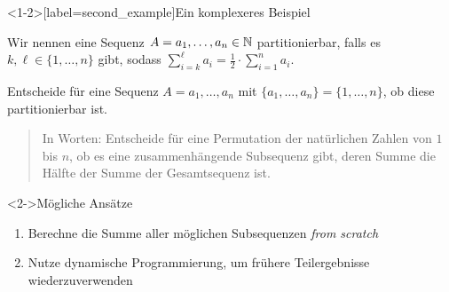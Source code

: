 \begin{frame}<1-2>[label=second_example]{Ein komplexeres Beispiel}
\begin{example}
Wir nennen eine Sequenz $A = a_1, \dots, a_n \in \mathbb{N}$ \alert{partitionierbar}, falls  es $k, \ell \in \{1, \dots, n\}$ gibt, sodass $\sum_{i=k}^{\ell} a_i = \frac{1}{2} \cdot  \sum_{i=1}^{n} a_i$.

Entscheide f\"ur eine Sequenz $A = a_1, \dots, a_n$ mit $\{ a_1, \dots, a_n \} = \{1, \dots, n\}$, ob diese partitionierbar ist.

\begin{quote}
    In Worten: Entscheide f\"ur eine \alert{Permutation} der nat\"urlichen Zahlen von $1$ bis $n$, ob es eine \alert{zusammenh\"angende Subsequenz} gibt, deren Summe die \alert{H\"alfte} der Summe der Gesamtsequenz ist.
\end{quote}

\begin{block}<2->{M\"ogliche Ans\"atze}
    \begin{enumerate}
        \item Berechne die Summe aller möglichen Subsequenzen \emph{from scratch}
        \pause
        \item<4-> Nutze \alert{dynamische Programmierung}, um fr\"uhere Teilergebnisse wiederzuverwenden
    \end{enumerate}
\end{block}
\end{example}
\end{frame}


